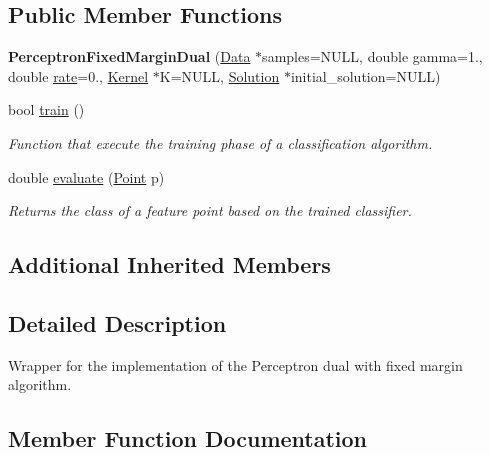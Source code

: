 \subsection*{Public Member Functions}
\begin{DoxyCompactItemize}
\item 
\mbox{\label{class_perceptron_fixed_margin_dual_ac58bf42eac090bba4221e761fbe7fd0c}} 
{\bfseries Perceptron\+Fixed\+Margin\+Dual} (\hyperlink{class_data}{Data} $\ast$samples=N\+U\+LL, double gamma=1., double \hyperlink{class_classifier_af9867e5919742de1303dd971a9a1c19a}{rate}=0., \hyperlink{class_kernel}{Kernel} $\ast$K=N\+U\+LL, \hyperlink{class_solution}{Solution} $\ast$initial\+\_\+solution=N\+U\+LL)
\item 
bool \hyperlink{class_perceptron_fixed_margin_dual_aa095c90a3d04f70e1cf2e38e2afa769b}{train} ()
\begin{DoxyCompactList}\small\item\em Function that execute the training phase of a classification algorithm. \end{DoxyCompactList}\item 
double \hyperlink{class_perceptron_fixed_margin_dual_a1370fdbc95bf728f82a83f219be32d23}{evaluate} (\hyperlink{class_point}{Point} p)
\begin{DoxyCompactList}\small\item\em Returns the class of a feature point based on the trained classifier. \end{DoxyCompactList}\end{DoxyCompactItemize}
\subsection*{Additional Inherited Members}


\subsection{Detailed Description}
Wrapper for the implementation of the Perceptron dual with fixed margin algorithm. 

\subsection{Member Function Documentation}
\mbox{\label{class_perceptron_fixed_margin_dual_a1370fdbc95bf728f82a83f219be32d23}} 
